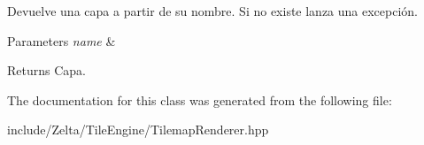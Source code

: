 Devuelve una capa a partir de su nombre. Si no existe lanza una excepción. 
\begin{DoxyParams}{Parameters}
{\em name} & \\
\hline
\end{DoxyParams}
\begin{DoxyReturn}{Returns}
Capa. 
\end{DoxyReturn}


The documentation for this class was generated from the following file\+:\begin{DoxyCompactItemize}
\item 
include/\+Zelta/\+Tile\+Engine/Tilemap\+Renderer.\+hpp\end{DoxyCompactItemize}
